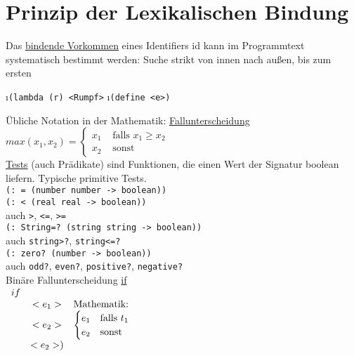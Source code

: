 \section*{Prinzip der Lexikalischen Bindung}
Das \underline{bindende Vorkommen} eines Identifiers id kann im Programmtext systematisch bestimmt werden: Suche strikt von innen nach au\ss en, bis zum ersten
\begin{enumerate}[(1)]
\i \lstinline!(lambda (r) <Rumpf>!
\i \lstinline!(define <e>)!
\end{enumerate}
\"Ubliche Notation in der Mathematik: \uline{Fallunterscheidung}\\
$max(x_1,x_2) =
\begin{cases}
x_1 &\text{ falls } x_1 \geq x_2\\
x_2 &\text{ sonst } 
\end{cases}$\\
\underline{Tests} (auch Pr\"adikate) sind Funktionen, die einen Wert der Signatur boolean liefern. Typische primitive Tests.\\
\lstinline!(: = (number number -> boolean))!\\
\lstinline!(: < (real real -> boolean))!\\
auch \lstinline!>!, \lstinline!<=!, \lstinline!>=!\\
\lstinline!(: String=? (string string -> boolean))!\\
auch \lstinline!string>?!, \lstinline!string<=?!\\
\lstinline!(: zero? (number -> boolean))!\\
auch \lstinline!odd?!, \lstinline!even?!, \lstinline!positive?!, \lstinline!negative?!\\
Bin\"are Fallunterscheidung \underline{if}\\
$\begin{array}{lcl}
if\\
& <e_1>& \text{Mathematik:}\\
& <e_2>& \begin{cases}e_1& \text{falls } t_1\\
					  e_2& \text{sonst}
\end{cases}\\
& <e_2>)
\end{array}$
